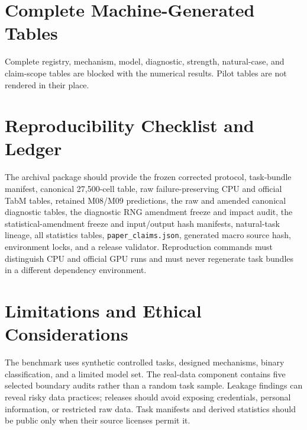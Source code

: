 \documentclass[letterpaper]{article}
\begin{document}
\section{Complete Machine-Generated Tables}
\ifLBResultsReady
{}
\else
Complete registry, mechanism, model, diagnostic, strength, natural-case, and
claim-scope tables are blocked with the numerical results.  Pilot tables are
not rendered in their place.
\fi

\section{Reproducibility Checklist and Ledger}
The archival package should provide the frozen corrected protocol, task-bundle
manifest, canonical 27,500-cell table, raw failure-preserving CPU and official
TabM tables, retained M08/M09 predictions, the raw and amended canonical
diagnostic tables, the diagnostic RNG amendment freeze and impact audit,
the statistical-amendment freeze and input/output hash manifests,
natural-task lineage, all statistics tables, \texttt{paper\_claims.json},
generated macro source hash, environment
locks, and a release validator.  Reproduction commands must distinguish CPU
and official GPU runs and must never regenerate task bundles in a different
dependency environment.

\section{Limitations and Ethical Considerations}
The benchmark uses synthetic controlled tasks, designed mechanisms, binary
classification, and a limited model set.  The real-data component contains five
selected boundary audits rather than a random task sample.  Leakage findings
can reveal risky data practices; releases should avoid exposing credentials,
personal information, or restricted raw data.  Task manifests and derived
statistics should be public only when their source licenses permit it.


\end{document}
